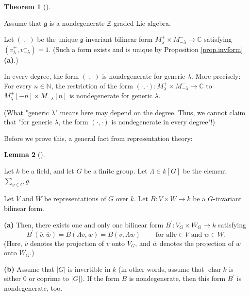 \documentclass
[numbers=enddot,12pt,final,onecolumn,german,notitlepage]{scrartcl}%
\theoremstyle{definition}
\newtheorem{theo}{Theorem}
\newenvironment{theorem}[1][]
{\begin{theo}[#1]\begin{leftbar}}
{\end{leftbar}\end{theo}}
\newtheorem{lem}[theo]{Lemma}
\newenvironment{lemma}[1][]
{\begin{lem}[#1]\begin{leftbar}}
{\end{leftbar}\end{lem}}
\begin{document}
\begin{theorem}
\label{thm.invformnondeg}Assume that $\mathfrak{g}$ is a nondegenerate
$\mathbb{Z}$-graded Lie algebra.

Let $\left(  \cdot,\cdot\right)  $ be the unique $\mathfrak{g}$-invariant
bilinear form $M_{\lambda}^{+}\times M_{-\lambda}^{-}\rightarrow\mathbb{C}$
satisfying $\left(  v_{\lambda}^{+},v_{-\lambda}^{-}\right)  =1$. (Such a form
exists and is unique by Proposition \ref{prop.invform} \textbf{(a)}.)

In every degree, the form $\left(  \cdot,\cdot\right)  $ is nondegenerate for
generic $\lambda$. More precisely: For every $n\in\mathbb{N}$, the restriction
of the form $\left(  \cdot,\cdot\right)  :M_{\lambda}^{+}\times M_{-\lambda
}^{-}\rightarrow\mathbb{C}$ to $M_{\lambda}^{+}\left[  -n\right]  \times
M_{-\lambda}^{-}\left[  n\right]  $ is nondegenerate for generic $\lambda$.

(What "generic $\lambda$" means here may depend on the degree. Thus, we cannot
claim that "for generic $\lambda$, the form $\left(  \cdot,\cdot\right)  $ is
nondegenerate in every degree"!)
\end{theorem}

Before we prove this, a general fact from representation theory:

\begin{lemma}
\label{lem.bilform}Let $k$ be a field, and let $G$ be a finite group. Let
$\Lambda\in k\left[  G\right]  $ be the element $\sum\limits_{g\in G}g$.

Let $V$ and $W$ be representations of $G$ over $k$. Let $B:V\times
W\rightarrow k$ be a $G$-invariant bilinear form.

\textbf{(a)} Then, there exists one and only one bilinear form $B^{\prime
}:V_{G}\times W_{G}\rightarrow k$ satisfying%
\[
B^{\prime}\left(  \overline{v},\overline{w}\right)  =B\left(  \Lambda
v,w\right)  =B\left(  v,\Lambda w\right)  \ \ \ \ \ \ \ \ \ \ \text{for all
}v\in V\text{ and }w\in W\text{.}%
\]
(Here, $\overline{v}$ denotes the projection of $v$ onto $V_{G}$, and
$\overline{w}$ denotes the projection of $w$ onto $W_{G}$.)

\textbf{(b)} Assume that $\left\vert G\right\vert $ is invertible in $k$ (in
other words, assume that $\operatorname*{char}k$ is either $0$ or coprime to
$\left\vert G\right\vert $). If the form $B$ is nondegenerate, then this form
$B^{\prime}$ is nondegenerate, too.
\end{lemma}
\end{document}
